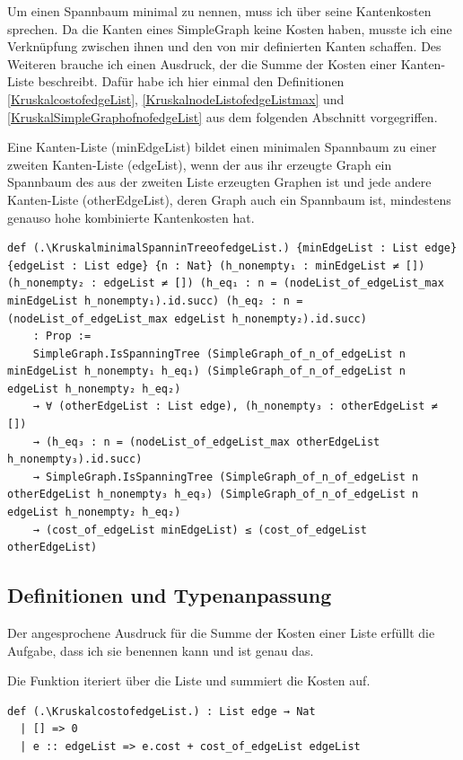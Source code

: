 Um einen Spannbaum minimal zu nennen, muss ich über seine Kantenkosten sprechen.
Da die Kanten eines SimpleGraph keine Kosten haben, musste ich eine Verknüpfung zwischen ihnen und den von mir definierten Kanten schaffen.
Des Weiteren brauche ich einen Ausdruck, der die Summe der Kosten einer Kanten-Liste beschreibt.
Dafür habe ich hier einmal den Definitionen \ref{KruskalcostofedgeList}, \ref{KruskalnodeListofedgeListmax} und \ref{KruskalSimpleGraphofnofedgeList} aus dem folgenden Abschnitt vorgegriffen.

\begin{definition}[\KruskalminimalSpanninTreeofedgeList]\label{KruskalminimalSpanninTreeofedgeList}
  Eine Kanten-Liste (minEdgeList) bildet einen minimalen Spannbaum zu einer zweiten Kanten-Liste (edgeList),
  wenn der aus ihr erzeugte Graph ein Spannbaum des aus der zweiten Liste erzeugten Graphen ist
  und jede andere Kanten-Liste (otherEdgeList), deren Graph auch ein Spannbaum ist, mindestens genauso hohe kombinierte Kantenkosten hat.
\end{definition}
\begin{lstlisting}
def (.\KruskalminimalSpanninTreeofedgeList.) {minEdgeList : List edge} {edgeList : List edge} {n : Nat} (h_nonempty₁ : minEdgeList ≠ []) (h_nonempty₂ : edgeList ≠ []) (h_eq₁ : n = (nodeList_of_edgeList_max minEdgeList h_nonempty₁).id.succ) (h_eq₂ : n = (nodeList_of_edgeList_max edgeList h_nonempty₂).id.succ)
    : Prop :=
    SimpleGraph.IsSpanningTree (SimpleGraph_of_n_of_edgeList n minEdgeList h_nonempty₁ h_eq₁) (SimpleGraph_of_n_of_edgeList n edgeList h_nonempty₂ h_eq₂)
    → ∀ (otherEdgeList : List edge), (h_nonempty₃ : otherEdgeList ≠ [])
    → (h_eq₃ : n = (nodeList_of_edgeList_max otherEdgeList h_nonempty₃).id.succ)
    → SimpleGraph.IsSpanningTree (SimpleGraph_of_n_of_edgeList n otherEdgeList h_nonempty₃ h_eq₃) (SimpleGraph_of_n_of_edgeList n edgeList h_nonempty₂ h_eq₂)
    → (cost_of_edgeList minEdgeList) ≤ (cost_of_edgeList otherEdgeList)
\end{lstlisting}

\subsection{Definitionen und Typenanpassung}

Der angesprochene Ausdruck für die Summe der Kosten einer Liste erfüllt die Aufgabe, dass ich sie benennen kann und ist genau das.

\begin{definition}[\KruskalcostofedgeList]\label{KruskalcostofedgeList}
  Die Funktion iteriert über die Liste und summiert die Kosten auf.
\end{definition}
\begin{lstlisting}
def (.\KruskalcostofedgeList.) : List edge → Nat
  | [] => 0
  | e :: edgeList => e.cost + cost_of_edgeList edgeList
\end{lstlisting}

